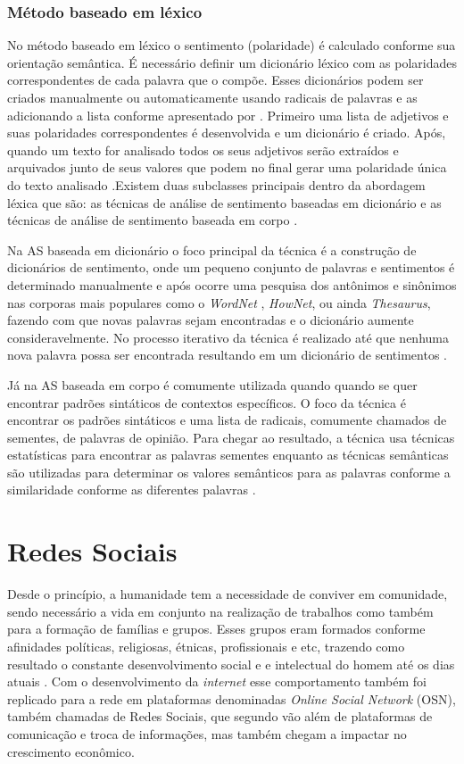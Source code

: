 \subsubsection{Método baseado em léxico}
\label{subsubsec:lexico}
No método baseado em léxico o sentimento (polaridade) é calculado conforme sua orientação semântica. É necessário definir um dicionário léxico com as polaridades correspondentes de cada palavra que o compõe. Esses dicionários podem ser criados manualmente ou automaticamente usando radicais de palavras e as adicionando a lista conforme apresentado por . Primeiro uma lista de adjetivos e suas polaridades correspondentes é desenvolvida e um dicionário é criado. Após, quando um texto for analisado todos os seus adjetivos serão extraídos e arquivados junto de seus valores que podem no final gerar uma polaridade única do texto analisado \cite{Taboada}.Existem duas subclasses principais dentro da abordagem léxica que são: as técnicas de análise de sentimento baseadas em dicionário e as técnicas de análise de sentimento baseada em corpo \cite{LIU2017149}.

Na AS baseada em dicionário o foco principal da técnica é a construção de dicionários de sentimento, onde um pequeno conjunto de palavras e sentimentos é determinado manualmente e após ocorre uma pesquisa dos antônimos e sinônimos nas corporas mais populares como o \textit{WordNet} \cite{Miller:1995:WLD:219717.219748}, \textit{HowNet}, ou ainda \textit{Thesaurus}, fazendo com que novas palavras sejam encontradas e o dicionário aumente consideravelmente. No processo iterativo da técnica é realizado até que nenhuma nova palavra possa ser encontrada resultando em um dicionário de sentimentos \cite{LIU2017149}. 

Já na AS baseada em corpo é comumente utilizada quando quando se quer encontrar padrões sintáticos de contextos específicos. O foco da técnica é encontrar os padrões sintáticos e uma lista de radicais, comumente chamados de sementes, de palavras de opinião. Para chegar ao resultado, a técnica usa técnicas estatísticas para encontrar as palavras sementes enquanto as técnicas semânticas são utilizadas para determinar os valores semânticos para as palavras conforme a similaridade conforme as diferentes palavras \cite{LIU2017149}.

\section{Redes Sociais}
\label{sec:RedesSociais}
Desde o princípio, a humanidade tem a necessidade de conviver em comunidade, sendo necessário a vida em conjunto na realização de trabalhos como também para a formação de famílias e grupos. Esses grupos eram formados conforme afinidades políticas, religiosas, étnicas, profissionais e etc, trazendo como resultado o constante desenvolvimento social e e intelectual do homem até os dias atuais \cite{KHALED2018}. Com o desenvolvimento da \textit{internet} esse comportamento também foi replicado para a rede em plataformas denominadas \textit{Online Social Network} (OSN), também chamadas de Redes Sociais, que segundo  vão além de plataformas de comunicação e troca de informações, mas também chegam a impactar no crescimento econômico. 

